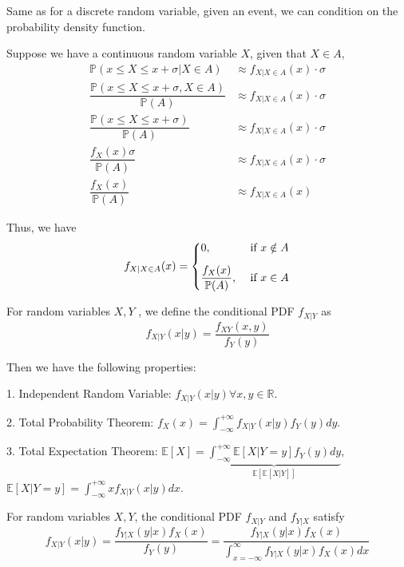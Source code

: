 \newpage
Same as for a discrete random variable, given an event, we can condition on the probability density function.  

Suppose we have a continuous random variable \(X\), given that \(X \in A\),
\[
\begin{aligned}
    \mathbb{P}(x \leq X \leq x + \sigma \vert X \in A) &\approx f_{X \vert X \in A} (x) \cdot \sigma \\
    \dfrac{\mathbb{P}(x \leq X \leq x + \sigma, X \in A)}{\mathbb{P}(A)} &\approx f_{X \vert X \in A} (x) \cdot \sigma \\
    \dfrac{\mathbb{P}(x \leq X \leq x + \sigma)}{\mathbb{P}(A)} &\approx f_{X \vert X \in A} (x) \cdot \sigma \\
    \dfrac{f_X(x) \sigma}{\mathbb{P}(A)} &\approx f_{X \vert X \in A} (x) \cdot \sigma \\
    \dfrac{f_X(x)}{\mathbb{P}(A)} &\approx f_{X \vert X \in A} (x)
\end{aligned} 
\] 

Thus, we have 
\[
    f_{X \vert X \in A} (x) = \begin{dcases}
       0 , &\text{ if } x \notin A \\[5pt]
       \dfrac{f_X(x)}{\mathbb{P}(A)} , &\text{ if } x \in A 
    \end{dcases}
\]

\begin{definition}
    For random variables \(X, Y\) , we define the conditional PDF \(f_{X \vert Y}\) as 
    \[
        f_{X \vert Y}(x \vert y) = \dfrac{f_{XY}(x, y)}{f_Y(y)}
    \]
\end{definition}

Then we have the following properties: 

1. Independent Random Variable: \(f_{X \vert Y}(x \vert y) \forall x, y \in \mathbb{R}\). 

2. Total Probability Theorem: \(f_X(x) = \displaystyle\int_{-\infty}^{+\infty} f_{X \vert Y}(x \vert y) f_Y(y) dy\). 

3. Total Expectation Theorem: \(\mathbb{E}[X] = \underbrace{\int_{-\infty}^{+\infty} \mathbb{E}[X \vert Y = y] f_Y(y) dy}_{\mathbb{E}[\mathbb{E}[X \vert Y]]}\), \(\mathbb{E}[X \vert Y = y] = \int_{-\infty}^{+\infty} x f_{X\vert Y} (x \vert y) dx\). 

\begin{theorem}
    For random variables \(X, Y\), the conditional PDF \(f_{X \vert Y}\) and \(f_{Y \vert X}\) satisfy 
    \[
        f_{X \vert Y} (x \vert y) = \dfrac{f_{Y \vert X}(y \vert x) f_X(x)}{f_Y(y)} = \dfrac{f_{Y \vert X}(y \vert x) f_X(x)}{\displaystyle\int_{x = -\infty}^{\infty} f_{Y \vert X}(y \vert x) f_X(x) dx}
    \]
\end{theorem}

